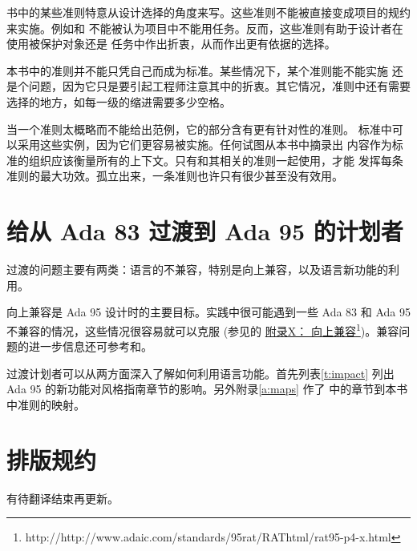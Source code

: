 书中的某些准则特意从设计选择的角度来写。这些准则不能被直接变成项目的规约
来实施。例如\cite{c:concurrency:pro-obj}和\cite{c:concurrency:task}
不能被认为项目中不能用任务。反而，这些准则有助于设计者在使用被保护对象还是
任务中作出折衷，从而作出更有依据的选择。

本书中的准则并不能只凭自己而成为标准。某些情况下，某个准则能不能实施
还是个问题，因为它只是要引起工程师注意其中的折衷。其它情况，准则中还有需要
选择的地方，如每一级的缩进需要多少空格。

当一个准则太概略而不能给出范例，它的部分含有更有针对性的准则。
标准中可以采用这些实例，因为它们更容易被实施。任何试图从本书中摘录出
内容作为标准的组织应该衡量所有的上下文。只有和其相关的准则一起使用，才能
发挥每条准则的最大功效。孤立出来，一条准则也许只有很少甚至没有效用。

\section{给从 Ada 83 过渡到 Ada 95 的计划者}
过渡的问题主要有两类：语言的不兼容，特别是向上兼容，以及语言新功能的利用。

向上兼容是 Ada 95 设计时的主要目标。实践中很可能遇到一些 Ada 83 和 Ada 95
不兼容的情况，这些情况很容易就可以克服 (参见\cite{rational95}的
\href{http://www.adaic.com/standards/95rat/RAThtml/rat95-p4-x.html}{附录X：
向上兼容}\footnote{http://http://www.adaic.com/standards/95rat/RAThtml/rat95-p4-x.html})。兼容问题的进一步信息还可参考\cite{taylor95}和\cite{interm95}。

过渡计划者可以从两方面深入了解如何利用语言功能。首先列表\ref{t:impact}
列出 Ada 95 的新功能对风格指南章节的影响。另外附录\ref{a:maps} 作了
\cite{arm95}中的章节到本书中准则的映射。

\section{排版规约}
有待翻译结束再更新。

\clearpage

